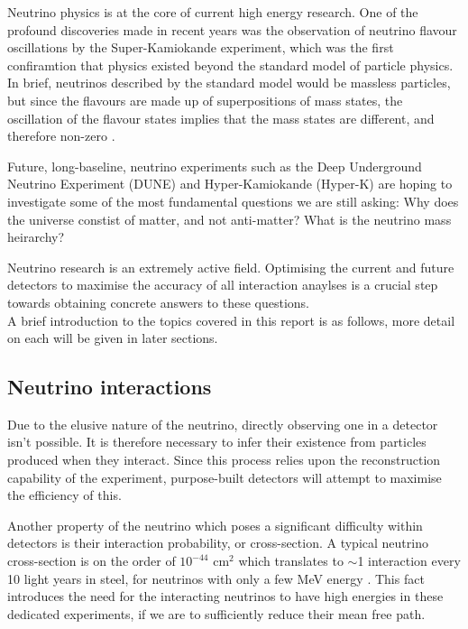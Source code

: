 

Neutrino physics is at the core of current high energy research. One of the profound discoveries made in recent years was the observation of neutrino flavour oscillations by the Super-Kamiokande experiment, which was the first confiramtion that physics existed beyond the standard model of particle physics. In brief, neutrinos described by the standard model would be massless particles, but since the flavours are made up of superpositions of mass states, the oscillation of
the flavour states implies that the mass states are different, and therefore non-zero \cite{nuInt}.

    Future, long-baseline,  neutrino experiments such as the Deep Underground Neutrino Experiment (DUNE) and Hyper-Kamiokande (Hyper-K) are hoping to investigate some of the most fundamental questions we are still asking: Why does the universe constist of matter, and not anti-matter? What is the neutrino mass heirarchy?

    Neutrino research is an extremely active field. Optimising the current and future detectors to maximise the accuracy of all interaction anaylses is a crucial step towards obtaining concrete answers to these questions. \\

    A brief introduction to the topics covered in this report is as follows, more detail on each will be given in later sections. 

\subsection{Neutrino interactions}

Due to the elusive nature of the neutrino, directly observing one in a detector isn't possible. It is therefore necessary to infer their existence from particles produced when they interact. Since this process relies upon the reconstruction capability of the experiment, purpose-built detectors will attempt to maximise the efficiency of this.

Another property of the neutrino which poses a significant difficulty within detectors is their interaction probability, or cross-section. A typical neutrino cross-section is on the order of $ 10^{-44} $ cm$^{2}$ which translates to $\sim$1 interaction every 10 light years in steel, for neutrinos with only a few MeV energy \cite{nuOsc}. This fact introduces the need for the interacting neutrinos to have high energies in these dedicated experiments, if we are to sufficiently reduce their mean free path. \\  

